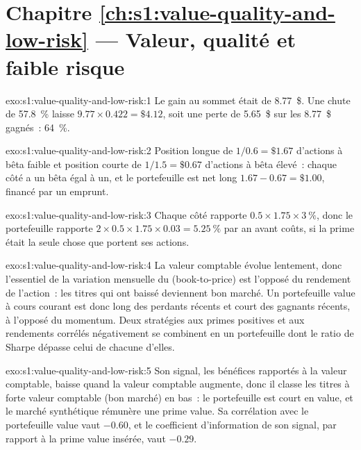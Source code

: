 \section*{Chapitre \ref{ch:s1:value-quality-and-low-risk} --- Valeur, qualité et faible risque}

\begin{solution}{exo:s1:value-quality-and-low-risk:1}
Le gain au sommet était de 8.77~\$. Une chute de 57.8~\% laisse $9.77 \times 0.422 = \$4.12$, soit une perte de 5.65~\$ sur les 8.77~\$ gagnés~: 64~\%.
\end{solution}

\begin{solution}{exo:s1:value-quality-and-low-risk:2}
Position longue de $1/0.6 = \$1.67$ d'actions à bêta faible et position courte de $1/1.5 = \$0.67$ d'actions à bêta élevé~: chaque côté a un bêta égal à un, et le portefeuille est net long
$1.67 - 0.67 = \$1.00$, financé par un emprunt.
\end{solution}

\begin{solution}{exo:s1:value-quality-and-low-risk:3}
Chaque côté rapporte $0.5 \times 1.75 \times 3~\%$, donc le portefeuille rapporte $2 \times 0.5 \times 1.75 \times 0.03 = 5.25~\%$ par an avant coûts, si la prime
était la seule chose que portent ses actions.
\end{solution}

\begin{solution}{exo:s1:value-quality-and-low-risk:4}
La valeur comptable évolue lentement, donc l'essentiel de la variation mensuelle du  (book-to-price) est l'opposé du rendement de l'action~: les titres qui ont baissé deviennent bon marché. Un portefeuille value à cours courant
est donc long des perdants récents et court des gagnants récents, à l'opposé du momentum. Deux stratégies aux primes positives et aux rendements
corrélés négativement se combinent en un portefeuille dont le ratio de Sharpe dépasse celui de chacune d'elles.
\end{solution}

\begin{solution}{exo:s1:value-quality-and-low-risk:5}
Son signal, les bénéfices rapportés à la valeur comptable, baisse quand la valeur comptable augmente, donc il classe les titres à forte valeur comptable (bon marché) en bas~: le portefeuille est court en value, et le marché synthétique rémunère une
prime value. Sa corrélation avec le portefeuille value vaut $-0.60$, et le coefficient d'information de son signal, par rapport à la prime value insérée, vaut $-0.29$.
\end{solution}

